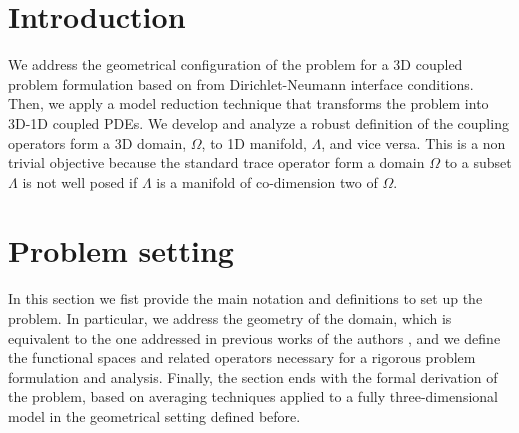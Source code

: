 \documentclass[r]{siamart171218}
\begin{document}
\section{Introduction}\label{sec:intro}

We address the geometrical configuration of the problem for a 3D coupled problem formulation based on from Dirichlet-Neumann interface conditions. Then, we apply a model reduction technique that transforms the problem into 3D-1D coupled PDEs. We develop and analyze a robust definition of the coupling operators form a 3D domain, $\Omega$, to 1D manifold, $\Lambda$, and vice versa. This is a non trivial objective because the standard trace operator form a domain $\Omega$ to a subset $\Lambda$ is not well posed if $\Lambda$ is a manifold of co-dimension two of $\Omega$.

\section{Problem setting}\label{sec:setting}

In this section we fist provide the main notation and definitions to set up the problem.
In particular, we address the geometry of the domain, which is equivalent to the one addressed in previous works of the authors \cite{laurino_m2an},
and we define the functional spaces and related operators necessary for a rigorous problem formulation and analysis.
Finally, the section ends with the formal derivation of the problem, 
based on averaging techniques applied to a fully three-dimensional model in the geometrical setting defined before.

\end{document}
